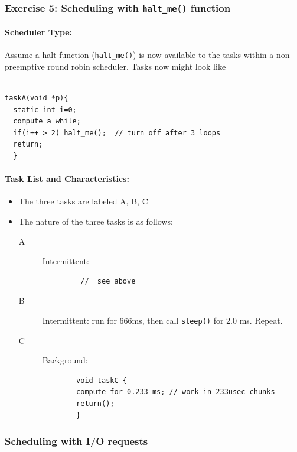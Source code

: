 
\subsubsection{Exercise 5: Scheduling with {\tt halt\_me()} function}

\paragraph{Scheduler Type:} Assume a halt function ({\tt halt\_me()}) is now available to the tasks within a non-preemptive round robin scheduler.   Tasks now might look like
\begin{verbatim}

taskA(void *p){
  static int i=0;
  compute a while;
  if(i++ > 2) halt_me();  // turn off after 3 loops
  return;
  }
\end{verbatim} 
\paragraph{Task List and Characteristics:}  
	\begin{itemize}
	\item The three tasks are labeled A, B, C
	\item The nature of the three tasks is as follows:
		\begin{description}
		\item [A] Intermittent:
		\begin{verbatim}
		 //  see above
		\end{verbatim}
		\item [B] Intermittent:  run for 666ms, then call {\tt sleep()} for 2.0 ms.  Repeat.
		\item [C] Background:
		\begin{verbatim}
		void taskC {
		compute for 0.233 ms; // work in 233usec chunks
		return();
		}
		\end{verbatim}
		\end{description} 
	\end{itemize}

 
  
\subsubsection*{Scheduling with I/O requests} 
